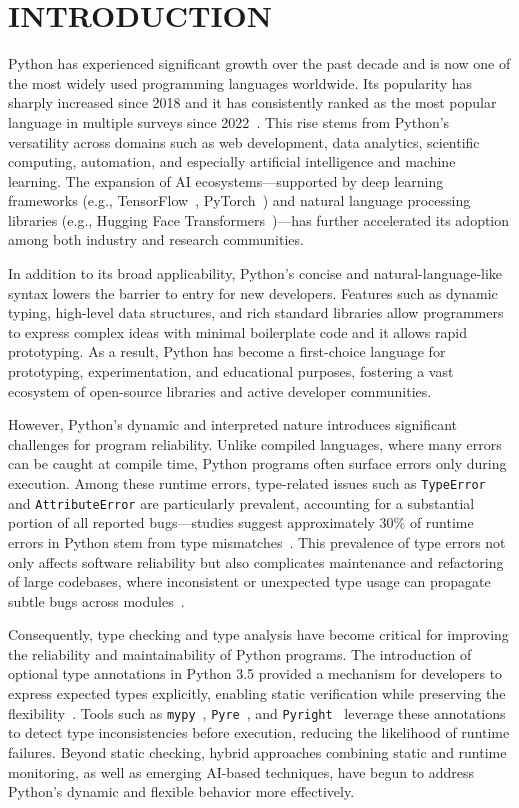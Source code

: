 \section{INTRODUCTION}

Python has experienced significant growth over the past decade and is now one
of the most widely used programming languages worldwide. Its popularity has
sharply increased since 2018 and it has consistently ranked as the most popular
language in multiple surveys since 2022~\cite{tiobe}.
This rise stems from Python’s versatility across domains such as web
development, data analytics, scientific computing, automation, and especially
artificial intelligence and machine learning.
The expansion of AI ecosystems—supported by deep learning frameworks (e.g.,
TensorFlow~\cite{tensorflow}, PyTorch~\cite{pytorch}) and natural language
processing libraries (e.g., Hugging Face Transformers~\cite{huggingface})—has
further accelerated its adoption among both industry and research communities.

In addition to its broad applicability, Python’s concise and
natural-language-like syntax lowers the barrier to entry for new developers. 
Features such as dynamic typing, high-level data structures, and rich standard
libraries allow programmers to express complex ideas with minimal boilerplate
code and it allows rapid prototyping.
As a result, Python has become a first-choice language for prototyping,
experimentation, and educational purposes, fostering a vast ecosystem of
open-source libraries and active developer communities.

However, Python’s dynamic and interpreted nature introduces significant
challenges for program reliability.
Unlike compiled languages, where many errors can be caught at compile time,
Python programs often surface errors only during execution.
Among these runtime errors, type-related issues such as \texttt{TypeError} and
\texttt{AttributeError} are particularly prevalent, accounting for a
substantial portion of all reported bugs—studies suggest approximately 30\% of
runtime errors in Python stem from type mismatches~\cite{pyinder2024}.
This prevalence of type errors not only affects software reliability but also
complicates maintenance and refactoring of large codebases, where inconsistent
or unexpected type usage can propagate subtle bugs across
modules~\cite{constypeerror}.

Consequently, type checking and type analysis have become critical for
improving the reliability and maintainability of Python programs.
The introduction of optional type annotations in Python 3.5 provided a
mechanism for developers to express expected types explicitly, enabling static
verification while preserving the flexibility~\cite{pep484}.
Tools such as \texttt{mypy}~\cite{mypy}, \texttt{Pyre}~\cite{pyre}, and
\texttt{Pyright}~\cite{pyright} leverage these annotations to detect type
inconsistencies before execution, reducing the likelihood of runtime failures.
Beyond static checking, hybrid approaches combining static and runtime
monitoring, as well as emerging AI-based techniques, have begun to address
Python’s dynamic and flexible behavior more effectively.

